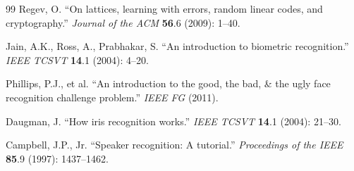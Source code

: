 \documentclass[11pt,letterpaper]{article}
\begin{document}
\begin{thebibliography}{99}
 Regev, O. ``On lattices, learning with errors, random linear codes, and cryptography.'' \textit{Journal of the ACM} \textbf{56}.6 (2009): 1--40.

 Jain, A.K., Ross, A., Prabhakar, S. ``An introduction to biometric recognition.'' \textit{IEEE TCSVT} \textbf{14}.1 (2004): 4--20.

 Phillips, P.J., et al. ``An introduction to the good, the bad, \& the ugly face recognition challenge problem.'' \textit{IEEE FG} (2011).

 Daugman, J. ``How iris recognition works.'' \textit{IEEE TCSVT} \textbf{14}.1 (2004): 21--30.

 Campbell, J.P., Jr. ``Speaker recognition: A tutorial.'' \textit{Proceedings of the IEEE} \textbf{85}.9 (1997): 1437--1462.

\end{thebibliography}
\end{document}
